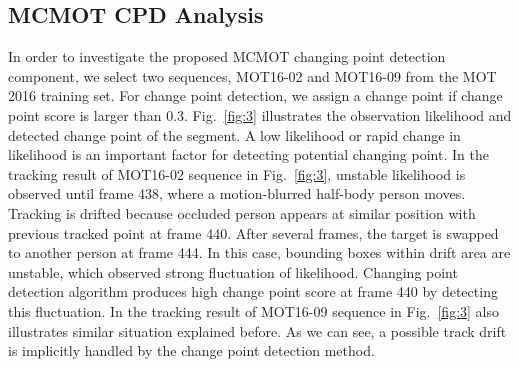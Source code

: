 \documentclass[runningheads]{llncs}
\begin{document}
\subsection{MCMOT CPD Analysis}

In order to investigate the proposed MCMOT changing point detection component, we select two sequences, MOT16-02 and MOT16-09 from the MOT 2016 training set. For change point detection, we assign a change point if change point score is larger than 0.3. Fig.~\ref{fig:3} illustrates the observation likelihood and detected change point of the segment. A low likelihood or rapid change in likelihood is an important factor for detecting potential changing point. In the tracking result of MOT16-02 sequence in Fig.~\ref{fig:3}, unstable likelihood is observed until frame 438, where a motion-blurred half-body person moves. Tracking is drifted because occluded person appears at similar position with previous tracked point at frame 440. After several frames, the target is swapped to another person at frame 444. In this case, bounding boxes within drift area are unstable, which observed strong fluctuation of likelihood. Changing point detection algorithm produces high change point score at frame 440 by detecting this fluctuation. In the tracking result of MOT16-09 sequence in Fig.~\ref{fig:3} also illustrates similar situation explained before. As we can see, a possible track drift is implicitly handled by the change point detection method. 
\end{document}
